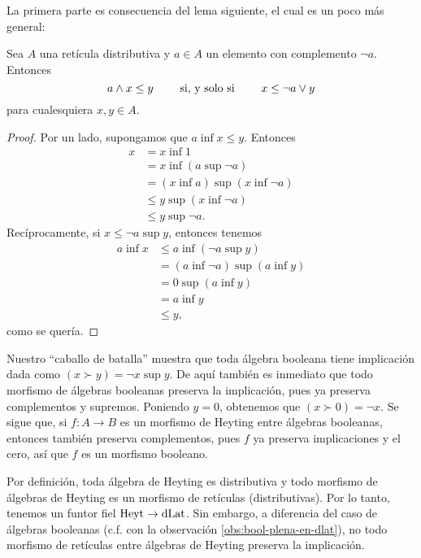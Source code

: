 La primera parte es consecuencia del lema siguiente, el cual es un
poco más general:

\begin{lemma} \label{lemma:caballo}
    Sea $A$ una retícula distributiva
    y $a\in A$ un elemento con complemento $\neg a$.
    Entonces
    \[
        a\wedge x \leq y  \qquad\text{ si, y solo si }\qquad x\leq \neg a\vee y
    \]
    para cualesquiera $x,y\in A$.
\end{lemma}
\begin{proof}
    Por un lado, supongamos que $a\inf x\leq y$.
    Entonces
    \begin{align*}
        x
        &= x \inf 1 \\
        &= x \inf (a\sup \neg a) \\
        &= (x\inf a)\sup(x\inf\neg a) \\
        &\leq y \sup (x\inf \neg a) \\
        &\leq y \sup \neg a.
    \end{align*}
    Recíprocamente, si $x\leq \neg a\sup y$, entonces tenemos
    \begin{align*}
        a\inf x
        &\leq a\inf(\neg a\sup y) \\
        &= (a\inf\neg a) \sup (a\inf y) \\
        &= 0\sup (a\inf y) \\
        &= a\inf y \\
        &\leq y,
    \end{align*}
    como se quería.
\end{proof}

Nuestro ``caballo de batalla'' muestra que toda álgebra booleana tiene
implicación dada como $(x\succ y)=\neg x\sup y$. De aquí también es
inmediato que todo morfismo de álgebras booleanas preserva
la implicación, pues ya preserva complementos y supremos.
Poniendo $y=0$, obtenemos que $(x\succ 0)=\neg x$.
Se sigue que, si $f:A\to B$ es un morfismo de Heyting entre
álgebras booleanas, entonces también preserva complementos, pues $f$
ya preserva implicaciones y el cero, así que $f$ es un morfismo
booleano.

Por definición, toda álgebra de Heyting es distributiva y todo
morfismo de álgebras de Heyting es un morfismo de retículas
(distributivas). Por lo tanto, tenemos un funtor fiel $\mathrm{Heyt}\to\mathrm{dLat}$.
Sin embargo, a diferencia del caso de álgebras booleanas (c.f. con la
observación \ref{obs:bool-plena-en-dlat}), no todo morfismo de
retículas entre álgebras de Heyting preserva la implicación.

